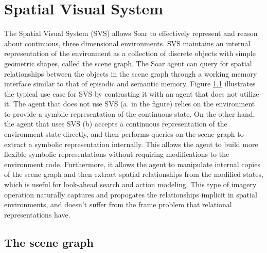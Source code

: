 \chapter{Spatial Visual System}
\label{SVS}

\begin{figure}
\label{fig:svs-setup}
\end{figure}

The Spatial Visual System (SVS) allows Soar to effectively represent and reason about continuous, three dimensional environments.
SVS maintains an internal representation of the environment as a collection of discrete objects with simple geometric shapes, called the scene graph.
The Soar agent can query for spatial relationships between the objects in the scene graph through a working memory interface similar to that of episodic and semantic memory.
Figure \ref{fig:svs-setup} illustrates the typical use case for SVS by contrasting it with an agent that does not utilize it.
The agent that does not use SVS (a. in the figure) relies on the environment to provide a symblic representation of the continuous state.
On the other hand, the agent that uses SVS (b) accepts a continuous representation of the environment state directly, and then performs queries on the scene graph to extract a symbolic representation internally.
This allows the agent to build more flexible symbolic representations without requiring modifications to the environment code.
Furthermore, it allows the agent to manipulate internal copies of the scene graph and then extract spatial relationships from the modified states, which is useful for look-ahead search and action modeling.
This type of imagery operation naturally captures and propogates the relationships implicit in spatial environments, and doesn't suffer from the frame problem that relational representations have.

\section{The scene graph}

